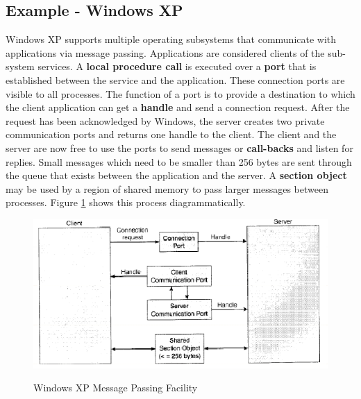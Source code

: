 \documentclass[10pt,a4paper]{article}
\begin{document}
{\subsection{Example - Windows XP}
Windows XP supports multiple operating subsystems that communicate with applications via message passing. Applications are considered clients of the sub-system services. A {\bf local procedure call} is executed over a {\bf port} that is established between the service and the application. These connection ports are visible to all processes. The function of a port is to provide a destination to which the client application can get a {\bf handle} and send a connection request. After the request has been acknowledged by Windows, the server creates two private communication ports and returns one handle to the client. The client and the server are now free to use the ports to send messages or {\bf call-backs} and listen for replies. Small messages which need to be smaller than 256 bytes are sent through the queue that exists between the application and the server. A {\bf section object} may be used by a region of shared memory to pass larger messages between processes. Figure \ref{winxpmsg} shows this process diagrammatically. 
\begin{figure}
\caption{Windows XP Message Passing Facility \cite{OSCONCEPTS}}
\begin{center}
\includegraphics[scale=0.45]{../images/windows-xp-message-passing.png}
\label{winxpmsg}
\end{center}
\end{figure}
}
\end{document}
